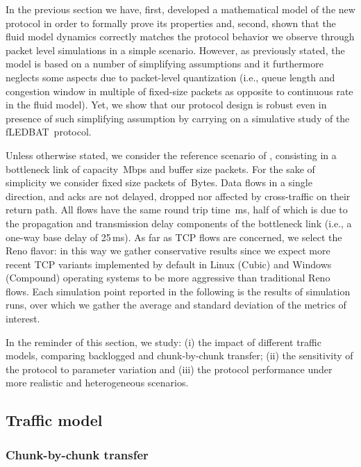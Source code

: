 \documentclass[conference]{IEEEtran}
\newcommand{\fledbat}[0]{fLEDBAT}
\begin{document}
In the previous section we have, first, developed a mathematical model of the
new protocol in order to formally prove its properties and, second, shown that the fluid model dynamics correctly matches the protocol behavior we observe through packet level simulations in a simple scenario.
However, as previously stated, the model is based on a number of simplifying assumptions
and it furthermore neglects some aspects due to packet-level quantization (i.e., queue length and congestion window in multiple of fixed-size packets as opposite to continuous rate in the fluid model). Yet, we show that our protocol design is robust even in presence of such simplifying assumption by carrying on a simulative study of the \fledbat\ protocol.


Unless otherwise stated, we consider the reference scenario of \cite{icccn10}, consisting in a bottleneck link of capacity \,Mbps and buffer size  packets. For the sake of simplicity we consider fixed size packets of \,Bytes. Data flows in a single direction, and acks are not delayed, dropped nor affected by cross-traffic on their return path.  All flows have the same round trip time \,ms, half of which is due to the propagation and transmission delay components of the bottleneck link (i.e., a one-way  base delay of 25\,ms). As far as TCP flows are concerned, we select the Reno flavor: in this way we gather conservative results since  we expect more recent TCP variants implemented by default in Linux (Cubic) and Windows (Compound) operating systems to be more aggressive than traditional Reno flows.
Each simulation point reported in the following is the results of  simulation runs, over which we gather the average and standard deviation of the metrics of interest.

In the reminder of this section, we study: (i) the impact of different traffic models, comparing backlogged and chunk-by-chunk transfer; (ii) the sensitivity of the protocol to  parameter variation and (iii) the protocol performance under more realistic and heterogeneous scenarios.

\subsection{Traffic model}

\subsubsection{Chunk-by-chunk transfer}
\end{document}
